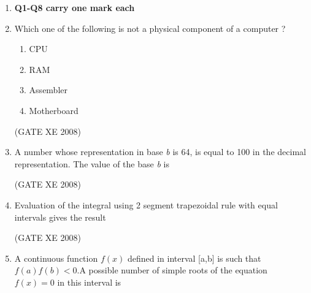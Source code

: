 \documentclass[12pt]{article}
\begin{document}
\begin{enumerate}
\item[] \textbf{Q1-Q8 carry one mark each}
\item  Which one of the following is not a physical component of a computer ?

\begin{enumerate}

\item  CPU 
\item  RAM
\item  Assembler 
\item  Motherboard
\end{enumerate}

(GATE XE 2008)
\item A number whose representation in base \textit{b}  is 64, is equal to 100 in the decimal representation. The value of the base \textit{b} is

\begin{enumerate}
\end{enumerate}

(GATE XE 2008)
\item Evaluation of the integral \newline using 2 segment trapezoidal rule with equal intervals gives the result

\begin{enumerate}
\end{enumerate}

(GATE XE 2008)
\item A continuous function $f(x)$ defined in interval [a,b] is such that $f(a)f(b)<0$.A possible number of simple roots of the equation $f(x)=0$ in this interval is

\begin{enumerate}
\end{enumerate}


\end{enumerate}
\end{document}
